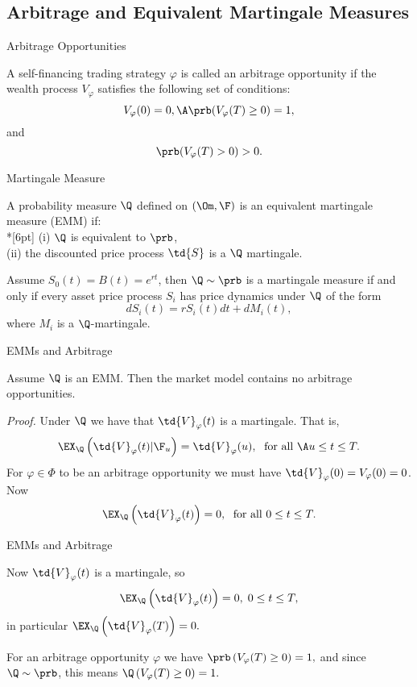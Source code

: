 \subsection{Arbitrage and Equivalent Martingale Measures}

{ Arbitrage Opportunities}

A self-financing trading strategy $\varphi$ is called an arbitrage
opportunity if the wealth process $V_\varphi$ satisfies the
following set of conditions:
$$
V_\varphi(0)=0,\A \prb(V_\varphi(T) \geq 0) =1,
$$
and
$$
\prb(V_\varphi(T) > 0) >0.
$$




{ Martingale Measure}

A probability measure $\Q$ defined on $(\Om,\F)$ is an equivalent
martingale measure (EMM) if:\\*[6pt]
(i) $\Q$ is equivalent to $\prb$,\\
(ii) the discounted price process $\td{S}$ is a $\Q$ martingale.


Assume $S_0(t) = B(t) = e^{rt}$, then $\Q \sim \prb$ is a
martingale measure if and only if every asset price process $S_i$
has price dynamics under $\Q$ of the form
$$
dS_i(t) = r S_i(t) dt + dM_i(t),
$$
where $M_i$ is a $\Q$-martingale.




{ EMMs and Arbitrage}


Assume $\Q$ is an EMM. Then the market model contains no arbitrage
opportunities.


{\it Proof.} Under $\Q$ we have that $\td{V}_\varphi(t)$ is a
martingale. That is,
$$
\EX_{\Q}\left(\td{V}_\varphi(t)|\F_u\right) = \td{V}_\varphi(u),\;
\mbox{ for all }\A u \leq t \leq T.
$$
For $\varphi \in \Phi$ to be an arbitrage opportunity we must have
$\td{V}_\varphi(0) =V_\varphi(0)= 0$.  Now
$$
\EX_{\Q}\left(\td{V}_\varphi(t)\right) = 0,\; \mbox{ for all } 0
\leq t \leq T.
$$




{ EMMs and Arbitrage}

Now $\td{V}_\varphi(t)$ is a martingale, so
$$
\EX_{\Q}\left(\td{V}_\varphi(t)\right) = 0,\; 0 \leq t \leq T,
$$
in particular $ \EX_{\Q}\left(\td{V}_\varphi(T)\right) = 0. $

For an arbitrage opportunity $\varphi$ we have $
\prb\left(V_\varphi(T) \geq 0\right) =1, $ and since $\Q \sim
\prb$, this means $ \Q\left(V_\varphi(T) \geq 0\right) =1. $

